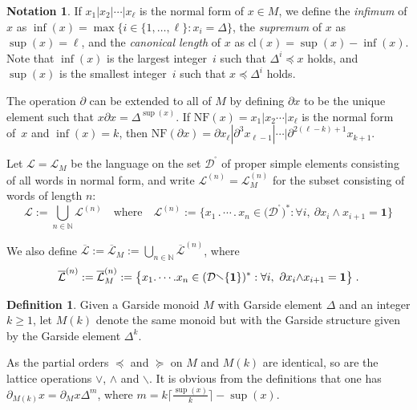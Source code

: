 \documentclass[a4paper,final]{article}
\let\ge\geqslant
\theoremstyle{plain}
\theoremstyle{remark}
\theoremstyle{definition}
\newtheorem{definition}[definition]{Definition}
\newtheorem{notation}[notation]{Notation}
\begin{document}
\begin{notation}
If $x_1|x_2|\cdots|x_\ell$ is the normal form of $x\in M$, we define the \emph{infimum} of $x$ as
$\inf(x) = \max\{ i\in\{1,\ldots,\ell\} : x_i = \Delta \}$, the \emph{supremum} of $x$ as $\sup(x) = \ell$, and the \emph{canonical length} of $x$ as ${\mathrm{cl}}(x) = \sup(x)-\inf(x)$.  Note that $\inf(x)$ is the largest integer~$i$ such that $\Delta^i{\preccurlyeq} x$ holds, and $\sup(x)$ is the smallest integer~$i$ such that $x{\preccurlyeq} \Delta^i$ holds.

The operation ${\partial}$ can be extended to all of $M$ by defining ${\partial} x$ to be the unique element such that $x {\partial} x = \Delta^{\sup(x)}$.
If ${\mathrm{NF}}(x) = x_1|x_2 \cdots|x_\ell$ is the normal form of~$x$ and $\inf(x)=k$, then
${\mathrm{NF}}({\partial} x) = {\partial} x_\ell| {\partial}^3 x_{\ell-1}| \cdots |{\partial}^{2(\ell-k)+1} x_{k+1}$.

Let ${\mathcal{L}}={\mathcal{L}}_M$ be the language on the set ${{\mathcal{D}}^{\!{}^{\circ}\!}}$ of proper simple elements
consisting of all words in normal form, and write ${\mathcal{L}}^{(n)}={\mathcal{L}}_M^{(n)}$ for
the subset consisting of words of length $n$:
\[
  {\mathcal{L}} := \bigcup_{n\in{\mathbb{N}}} {\mathcal{L}}^{(n)} \quad\text{where}\quad
  {\mathcal{L}}^{(n)} := \big\{ 
      x_1 {\mathbin{.}} \cdots {\mathbin{.}} x_n \in \big({{\mathcal{D}}^{\!{}^{\circ}\!}}\big)^* :
      \forall i,\ {\partial} x_i {\wedge} x_{i+1} = {\mathbf{1}} 
    \big\}
\]

We also define ${\overline{\mathcal{L}}} := {\overline{\mathcal{L}}}_M := \bigcup_{n\in{\mathbb{N}}} {\overline{\mathcal{L}}}^{(n)}$, where
\[
  {\overline{\mathcal{L}}}^{(n)} := {\overline{\mathcal{L}}}_M^{(n)} := \big\{ 
      x_1 {\mathbin{.}} \cdots {\mathbin{.}} x_n \in ({\mathcal{D}}{\mathbin{\raisebox{0.25ex}{$\smallsetminus$}}}\{{\mathbf{1}}\})^* :
      \forall i,\ {\partial} x_i {\wedge} x_{i+1} = {\mathbf{1}} 
    \big\} \;.
\]
\end{notation}

\begin{definition} {} {}
  Given a Garside monoid $M$ with Garside element $\Delta$ and an integer $k\ge1$, let $M(k)$
  denote the same monoid but with the Garside structure given by the
  Garside element $\Delta^k$.
\end{definition}

As the partial orders ${\preccurlyeq}$ and ${\succcurlyeq}$ on $M$ and $M(k)$ are identical, so are the lattice operations ${\vee}$, ${\wedge}$ and ${\backslash}$.  It is obvious from the definitions that one has
${\partial}_{M(k)} x = {\partial}_M x \Delta^m$, where $m = k\big\lceil\frac{\sup(x)}{k}\big\rceil-\sup(x)$.
\end{document}
